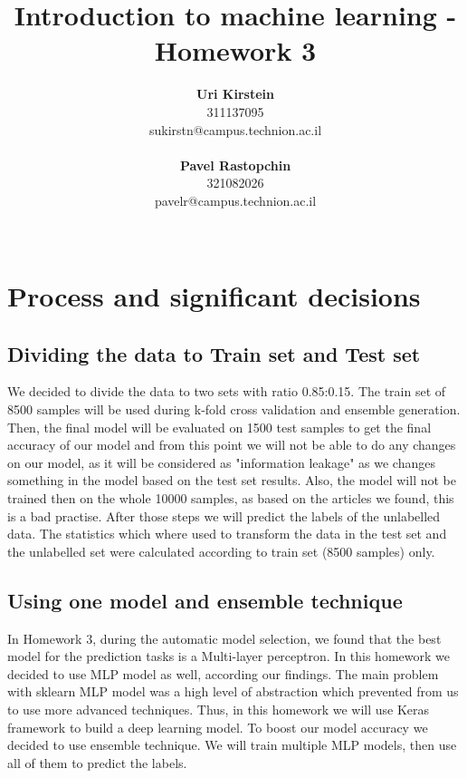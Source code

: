 \documentclass[12pt]{article}
\begin{document}
\title{\Huge Introduction to machine learning - Homework 3}

\author{
  \textbf{Uri Kirstein}\\
  311137095 \\ sukirstn@campus.technion.ac.il
  \\ \\
  \textbf{Pavel Rastopchin}\\
  321082026 \\ pavelr@campus.technion.ac.il
  \\ \\ 
}

\maketitle


\newpage
\section{Process and significant decisions}
\subsection{Dividing the data to Train set and Test set}
We decided to divide the data to two sets with ratio 0.85:0.15. The train set of 8500 samples will be used during k-fold cross validation and ensemble generation. Then, the final model will be evaluated on 1500 test samples to get the final accuracy of our model and from this point we will not be able to do any changes on our model, as it will be considered as "information leakage" as we changes something in the model based on the test set results. Also, the model will not be trained then on the whole 10000 samples, as based on the articles we found, this is a bad practise. After those steps we will predict the labels of the unlabelled data. The statistics which where used to transform the data in the test set and the unlabelled set were calculated according to train set (8500 samples) only.  

\subsection{Using one model and ensemble technique}
In Homework 3, during the automatic model selection, we found that the best model for the prediction tasks is a Multi-layer perceptron. In this homework we decided to use MLP model as well, according our findings. The main problem with sklearn MLP model was a high level of abstraction which prevented from us to use more advanced techniques. Thus, in this homework we will use Keras framework to build a deep learning model. To boost our model accuracy we decided to use ensemble technique. We will train multiple MLP models, then use all of them to predict the labels. 
\end{document}
